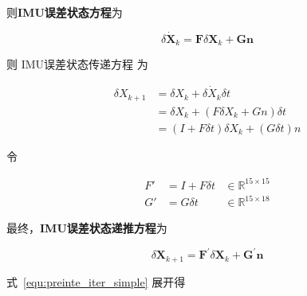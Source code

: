 \documentclass[12pt,a4paper]{article}
\begin{document}
则\textbf{IMU误差状态方程}为

\begin{equation}
\dot{\delta \mathbf{X}_k} = \mathbf{F} \delta \mathbf{X}_k + \mathbf{G} \mathbf{n}
\end{equation}

则 IMU误差状态传递方程 为

\begin{equation}
\label{equ:preinte_iter_time}
\begin{aligned}
\delta X_{k+1}
&= \delta X_k + \dot{\delta X_k} \delta t \\
&= \delta X_k + (F \delta X_k + Gn) \delta t \\
&= (I + F \delta t) \delta X_k + (G \delta t) n
\end{aligned}
\end{equation}

令

\begin{equation}
\label{equ:F1_G1}
\begin{aligned}
F' &= I + F \delta t &\in \mathbb{R}^{15 \times 15} \\
G' &= G \delta t     &\in \mathbb{R}^{15 \times 18}
\end{aligned}
\end{equation}

最终，\textbf{IMU误差状态递推方程}为

\begin{equation}
\label{equ:preinte_iter_simple}
\delta \mathbf{X}_{k+1} 
= \mathbf{F}^{\prime} \delta \mathbf{X}_k + \mathbf{G}^{\prime} \mathbf{n}
\end{equation}

式~\eqref{equ:preinte_iter_simple} 展开得
\end{document}
